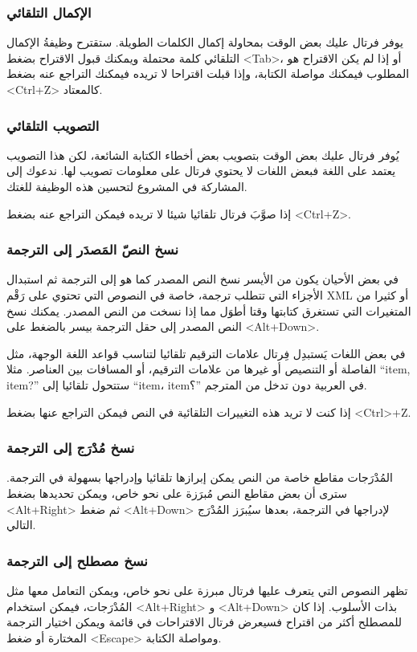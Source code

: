 \subsubsection{الإكمال التلقائي}
يوفر فرتال عليك بعض الوقت بمحاولة إكمال الكلمات الطويلة. ستقترح وظيفةُ
الإكمال التلقائي كلمة محتملة ويمكنك قبول الاقتراح بضغط <Tab>، أو إذا لم
يكن الاقتراح هو المطلوب فيمكنك مواصلة الكتابة، وإذا قبلت اقتراحا لا
تريده فيمكنك التراجع عنه بضغط <Ctrl+Z> كالمعتاد.

\subsubsection{التصويب التلقائي}
يُوفر فرتال عليك بعض الوقت بتصويب بعض أخطاء الكتابة الشائعة، لكن هذا
التصويب يعتمد على اللغة فبعض اللغات لا يحتوي فرتال على معلومات تصويب
لها. ندعوك إلى المشاركة في المشروع لتحسين هذه الوظيفة للغتك.

إذا صوَّبَ فرتال تلقائيا شيئا لا تريده فيمكن التراجع عنه بضغط <Ctrl+Z>.

\subsubsection{نسخ النصّ المَصدَر إلى الترجمة}
في بعض الأحيان يكون من الأيسر نسخ
النص المصدر كما هو إلى الترجمة ثم استبدال الأجزاء التي تتطلب ترجمة،
خاصة في النصوص التي تحتوي على رَقْم XML أو كثيرا من المتغيرات التي
تستغرق كتابتها وقتا أطوَل مما إذا نسخت من النص المصدر. يمكنك نسخ النص
المصدر إلى حقل الترجمة بيسر بالضغط على <Alt+Down>.

في بعض اللغات يَستبدِل فِرتال علامات الترقيم تلقائيا لتناسب قواعد اللغة
الوجهة، مثل الفاصلة أو التنصيص أو غيرها من علامات الترقيم، أو المسافات
بين العناصر. مثلا ‪“item, item?”‬ ستتحول تلقائيا إلى ‪“item، item؟”‬ في
العربية دون تدخل من المترجم.

إذا كنت لا تريد هذه التغييرات التلقائية في النص فيمكن التراجع عنها بضغط
<Ctrl>+Z.

\subsubsection{نسخ مُدْرَج إلى الترجمة}
المُدْرَجات مقاطع خاصة من النص
يمكن إبرازها تلقائيا وإدراجها بسهولة في الترجمة. سترى أن بعض مقاطع النص
مُبرَزة على نحو خاص، ويمكن تحديدها بضغط <Alt+Right> ثم ضغط <Alt+Down>
لإدراجها في الترجمة، بعدها سيُبرَز المُدْرَج التالي.

\subsubsection{نسخ مصطلح إلى الترجمة}
تظهر النصوص التي يتعرف عليها فرتال مبرزة على نحو خاص، ويمكن التعامل معها
مثل المُدْرَجات، فيمكن استخدام <Alt+Right> و <Alt+Down> بذات الأسلوب.
إذا كان للمصطلح أكثر من اقتراح فسيعرض فرتال الاقتراحات في قائمة ويمكن
اختيار الترجمة المختارة أو ضغط <Escape> ومواصلة الكتابة.

